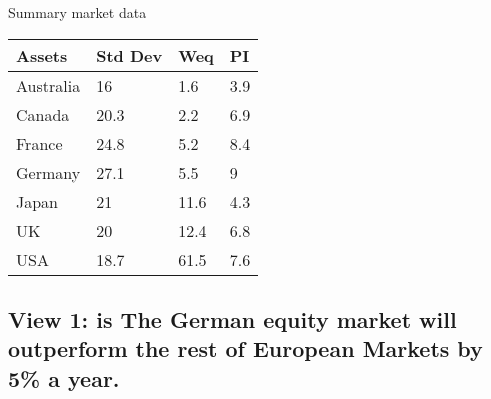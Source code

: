 \documentclass[
]{article}
\begin{document}
Summary market data

\begin{tabular}{llll}
\toprule
Assets & Std Dev & Weq & PI\\
\midrule
Australia & 16 & 1.6 & 3.9\\
Canada & 20.3 & 2.2 & 6.9\\
France & 24.8 & 5.2 & 8.4\\
Germany & 27.1 & 5.5 & 9\\
Japan & 21 & 11.6 & 4.3\\
\addlinespace
UK & 20 & 12.4 & 6.8\\
USA & 18.7 & 61.5 & 7.6\\
\bottomrule
\end{tabular}

\hypertarget{view-1-is-the-german-equity-market-will-outperform-the-rest-of-european-markets-by-5-a-year.}{%
\subsection{View 1: is The German equity market will outperform the rest
of European Markets by 5\% a
year.}\label{view-1-is-the-german-equity-market-will-outperform-the-rest-of-european-markets-by-5-a-year.}}
\end{document}

